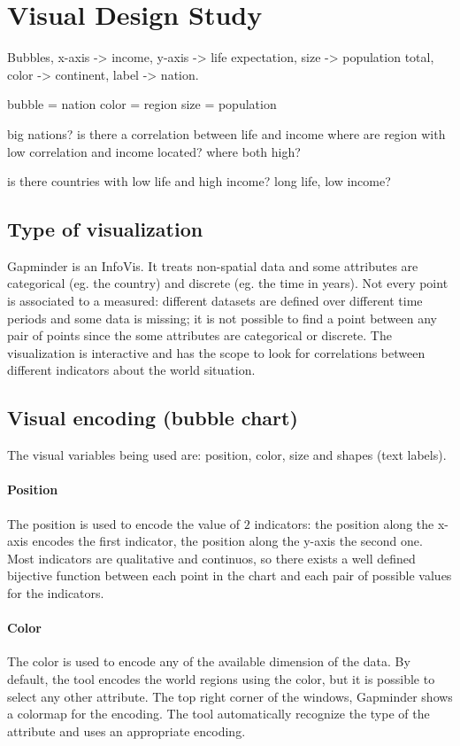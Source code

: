 \section{Visual Design Study}
\label{sec:visual_design}

Bubbles, x-axis -> income, y-axis -> life expectation, size -> population total, color -> continent, label -> nation.

bubble = nation
color = region
size = population

big nations?
is there a correlation between life and income
where are region with low correlation and income located?
where both high?

is there countries with low life and high income?
long life, low income?

\subsection{Type of visualization}
Gapminder is an InfoVis.
It treats non-spatial data and some attributes are categorical (eg. the country) and discrete (eg. the time in years).
Not every point is associated to a measured: different datasets are defined over different time periods and some data is missing; it is not possible to find a point between any pair of points since the some attributes are categorical or discrete.
The visualization is interactive and has the scope to look for correlations between different indicators about the world situation.

\subsection{Visual encoding (bubble chart)}
The visual variables being used are: position, color, size and shapes (text labels).

\paragraph{Position}
The position is used to encode the value of $2$ indicators: the position along the x-axis encodes the first indicator, the position along the y-axis the second one.
Most indicators are qualitative and continuos, so there exists a well defined bijective function between each point in the chart and each pair of possible values for the indicators.


\paragraph{Color}
The color is used to encode any of the available dimension of the data.
By default, the tool encodes the world regions using the color, but it is possible to select any other attribute.
The top right corner of the windows, Gapminder shows a colormap for the encoding.
The tool automatically recognize the type of the attribute and uses an appropriate encoding.

